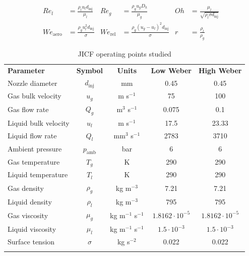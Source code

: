 \begin{equation}
\label{eq:dimensionless_numbers_jicf}
\begin{aligned}
Re_l &= \frac{\rho_l u_l d_\mathrm{inj}}{\mu_l}          &  Re_g &= \frac{\rho_g u_g D_h}{\mu_g}              &  Oh &=  \frac{\mu_l}{\sqrt{\rho_l \sigma d_\mathrm{inj}}}\\
We_\mathrm{aero} &= \frac{\rho_g u_l^2 d_\mathrm{inj}}{\sigma}    &  We_\mathrm{rel} &= \frac{\rho_g \left( u_g - u_l \right)^2 d_\mathrm{inj}}{\sigma}          & r &= \frac{\rho_l}{\rho_g} 
\end{aligned}
\end{equation}

\clearpage


\begin{table}[!h]
\centering
\caption{JICF operating points studied}
\begin{tabular}{lcccc}
\thickhline
\textbf{Parameter} & \textbf{Symbol} & \textbf{Units} &  \textbf{Low Weber} &  \textbf{High Weber} \\ %
\thickhline
Nozzle diameter & $d_\mathrm{inj}$ & mm & 0.45 & 0.45 \\
Gas bulk velocity & $u_g$ & m s$^{-1}$ & 75 & 100 \\
Gas flow rate & $Q_g$ & m$^3$ s$^{-1}$ & 0.075  & 0.1 \\
Liquid bulk velocity & $u_l$ & m s$^{-1}$ & 17.5  & 23.33 \\
Liquid flow rate & $Q_l$ & mm$^3$ s$^{-1}$ & 2783  & 3710 \\
Ambient pressure & $p_\mathrm{amb}$ & bar &  6 & 6 \\
Gas temperature & $T_g$ & K & 290 & 290 \\
Liquid temperature & $T_l$ & K & 290 & 290 \\
Gas density & $\rho_g$ & kg m$^{-3}$ &  7.21 & 7.21 \\
Liquid density & $\rho_l$ & kg m$^{-3}$ &  795 & 795  \\
Gas viscosity & $\mu_g$ & kg m$^{-1}$ s$^{-1}$ & $1.8162 \cdot 10^{-5}$ &  $1.8162 \cdot 10^{-5}$  \\
Liquid viscosity & $\mu_l$ & kg m$^{-1}$ s$^{-1}$ & $1.5 \cdot 10^{-3}$ & $1.5 \cdot 10^{-3}$  \\
Surface tension & $\sigma$ & kg s$^{-2}$ &  0.022 & 0.022  \\
\thickhline

\end{tabular}
\end{table}
